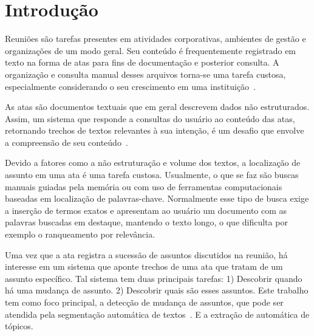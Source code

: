 \chapter{Introdução}\label{chap:introducao}


Reuniões são tarefas presentes em atividades corporativas, ambientes de gestão e organizações de um modo geral. Seu conteúdo é frequentemente registrado em texto na forma de atas para fins de documentação e posterior consulta. 
A organização e consulta manual desses arquivos torna-se uma tarefa custosa, especialmente considerando o seu crescimento em uma instituição~\cite{Lee2011, Masakazu2013,Miriam2013}. 


As atas são documentos textuais que em geral descrevem dados não estruturados. Assim, um sistema que responde a consultas do usuário ao conteúdo das atas, retornando trechos de textos relevantes à sua intenção, é um desafio que envolve a compreensão de seu conteúdo~\cite{Bokaei2015}. 

%  
Devido a fatores como a não estruturação e volume dos textos, a localização de assunto em uma ata é uma tarefa custosa. 
%  
Usualmente, o que se faz são buscas manuais guiadas pela memória ou com uso de ferramentas computacionais baseadas em localização de palavras-chave.
%  
Normalmente esse tipo de busca exige a inserção de termos exatos e 
%  
apresentam ao usuário um documento com as palavras buscadas em destaque, mantendo o texto longo, 
%  
o que dificulta por exemplo o ranqueamento por relevância. 




Uma vez que a ata registra a sucessão de assuntos discutidos na reunião, há interesse em um sistema que aponte trechos de uma ata que tratam de um assunto específico. Tal sistema tem duas principais tarefas: 1) Descobrir quando há uma mudança de assunto. 2) Descobrir quais são esses assuntos. Este trabalho tem como foco principal, a detecção de mudança de assuntos, que pode ser atendida pela segmentação automática de textos~\cite{Chen2017,Naili2016,Cardoso2017}. E a extração de automática de tópicos. 





